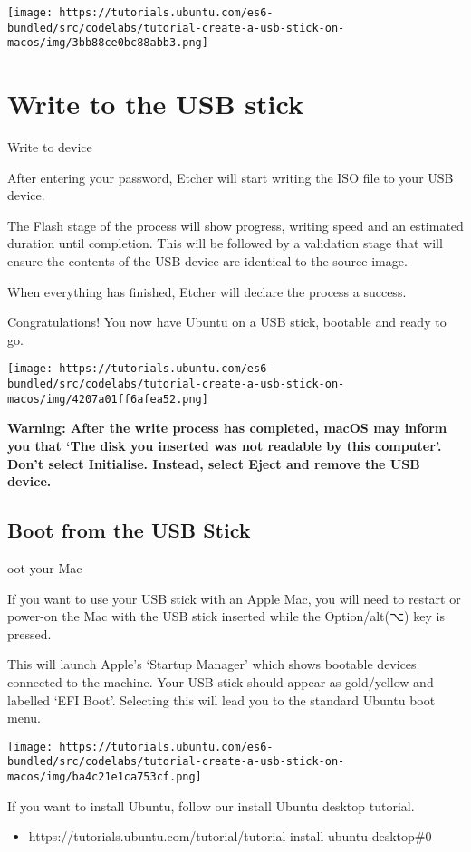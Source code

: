 \texttt{[image: https://tutorials.ubuntu.com/es6-bundled/src/codelabs/tutorial-create-a-usb-stick-on-macos/img/3bb88ce0bc88abb3.png]}

\section{Write to the USB stick}

Write to device

After entering your password, Etcher will start writing the ISO file to
your USB device.

The Flash stage of the process will show progress, writing speed and an
estimated duration until completion. This will be followed by a
validation stage that will ensure the contents of the USB device are
identical to the source image.

When everything has finished, Etcher will declare the process a success.

Congratulations! You now have Ubuntu on a USB stick, bootable and ready
to go.

\texttt{[image: https://tutorials.ubuntu.com/es6-bundled/src/codelabs/tutorial-create-a-usb-stick-on-macos/img/4207a01ff6afea52.png]}

\textbf{Warning: After the write process has completed, macOS may inform
you that `The disk you inserted was not readable by this computer'.
Don't select Initialise. Instead, select Eject and remove the USB
device.}

\subsection{Boot from the USB Stick}

oot your Mac

If you want to use your USB stick with an Apple Mac, you will need to
restart or power-on the Mac with the USB stick inserted while the
Option/alt(⌥) key is pressed.

This will launch Apple's `Startup Manager' which shows bootable devices
connected to the machine. Your USB stick should appear as gold/yellow
and labelled `EFI Boot'. Selecting this will lead you to the standard
Ubuntu boot menu.

\texttt{[image: https://tutorials.ubuntu.com/es6-bundled/src/codelabs/tutorial-create-a-usb-stick-on-macos/img/ba4c21e1ca753cf.png]}

If you want to install Ubuntu, follow our install Ubuntu desktop
tutorial.

\begin{itemize}
\item
  https://tutorials.ubuntu.com/tutorial/tutorial-install-ubuntu-desktop\#0
\end{itemize}

